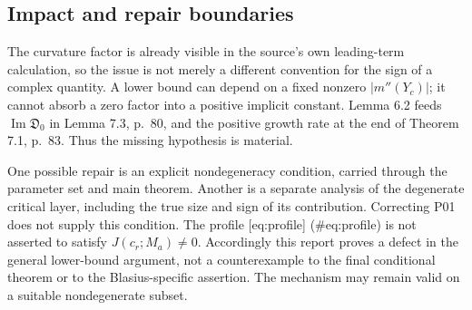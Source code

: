\documentclass[10pt]{article}
\begin{document}
\subsection*{Impact and repair boundaries}
The curvature factor is already visible in the source’s own leading-term calculation, so the issue is not merely a different convention for the sign of a complex quantity. A lower bound can depend on a fixed nonzero \(|m''(Y_c)|\); it cannot absorb a zero factor into a positive implicit constant. Lemma 6.2 feeds \(\operatorname{Im}\mathfrak D_0\) in Lemma 7.3, p. 80, and the positive growth rate at the end of Theorem 7.1, p. 83. Thus the missing hypothesis is material.\par
One possible repair is an explicit nondegeneracy condition, carried through the parameter set and main theorem. Another is a separate analysis of the degenerate critical layer, including the true size and sign of its contribution. Correcting P01 does not supply this condition. The profile [eq:profile] (\#eq:profile) is not asserted to satisfy \(J(c_r;M_a)\ne0\). Accordingly this report proves a defect in the general lower-bound argument, not a counterexample to the final conditional theorem or to the Blasius-specific assertion. The mechanism may remain valid on a suitable nondegenerate subset.\par
\end{document}
